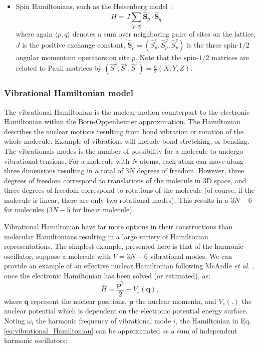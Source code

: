 \begin{itemize}
    \item Spin Hamiltonians, such as the Heisenberg model~\cite{bosse2021probing,kattemolle2021variational}:
    \begin{equation}
        \hat{H} = J \sum_{\langle p,q \rangle} \hat{\boldsymbol{S}}_p \cdot \hat{\boldsymbol{S}}_q
    \end{equation}
    where again $ \langle p,q \rangle$ denotes a sum over neighboring pairs of sites on the lattice, $J$ is the positive exchange constant, $\hat{\boldsymbol{S}}_p = (\hat{S}^x_p, \hat{S}^y_p, \hat{S}^z_p)$ is the three spin-$1/2$ angular momentum operators on site $p$. Note that the spin-$1/2$ matrices are related to Pauli matrices by $(\hat{S}^x, \hat{S}^y, \hat{S}^z)=\frac{\hbar}{2}(X, Y, Z)$.

\end{itemize}

\subsubsection{Vibrational Hamiltonian model} 

The vibrational Hamiltonian is the nuclear-motion counterpart to the electronic Hamiltonian within the Born-Oppenheimer approximation. The Hamiltonian describes the nuclear motions resulting from bond vibration or rotation of the whole molecule. Example of vibrations will include bond stretching, or bending. The vibrationals modes is the number of possibility for a molecule to undergo vibrational tensions. For a molecule with $N$ atoms, each atom can move along three dimensions resulting in a total of $3N$ degrees of freedom. However, three degrees of freedom correspond to translations of the molecule in 3D space, and three degrees of freedom correspond to rotations of the molecule (of course, if the molecule is linear, there are only two rotational modes). This results in a $3N - 6$ for molecules ($3N - 5$ for linear molecule). 

Vibrational Hamiltonian have far more options in their constructions than molecular Hamiltonians \cite{03PeHa} resulting in a large variety of Hamiltonian representations. The simplest example, presented here is that of the harmonic oscillator, suppose a molecule with $V = 3N - 6$ vibrational modes. We can provide an example of an effective nuclear Hamiltonian following McArdle \textit{et al.} \cite{McArdle2019_vibra}, once the electronic Hamiltonian has been solved (or estimated), as: 
\begin{equation}
\label{eq:vibrational_Hamiltonian}
\hat{H} = \frac{\boldsymbol{p}^2}{2} + V_s(\boldsymbol{q}),
\end{equation}
where $\boldsymbol{q}$ represent the nuclear positions, $\boldsymbol{p}$ the nuclear momenta, and $V_s(.)$ the nuclear potential which is dependent on the electronic potential energy surface. Noting $\omega_i$ the harmonic frequency of vibrational mode $i$, the Hamiltonian in Eq. \ref{eq:vibrational_Hamiltonian} can be approximated as a sum of independent harmonic oscillators: 

